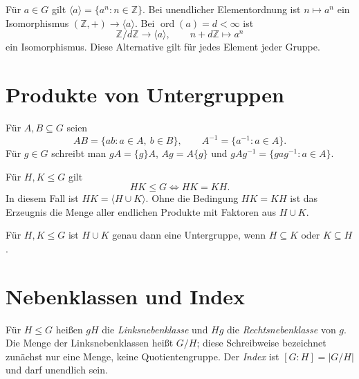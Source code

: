 \begin{theorem}
Für \(a\in G\) gilt \(\langle a\rangle=\{a^n:n\in\mathbb Z\}\).
Bei unendlicher Elementordnung ist \(n\mapsto a^n\) ein Isomorphismus
\((\mathbb Z,+)\to\langle a\rangle\).
Bei \(\operatorname{ord}(a)=d<\infty\) ist
\[
 \mathbb Z/d\mathbb Z\longrightarrow\langle a\rangle,\qquad
 n+d\mathbb Z\longmapsto a^n
\]
ein Isomorphismus. Diese Alternative gilt für jedes Element jeder Gruppe.
\cite{milne}
\end{theorem}

\section{Produkte von Untergruppen}

\begin{definition}
Für \(A,B\subseteq G\) seien
\[
 AB=\{ab:a\in A,\ b\in B\},\qquad A^{-1}=\{a^{-1}:a\in A\}.
\]
Für \(g\in G\) schreibt man \(gA=\{g\}A\), \(Ag=A\{g\}\)
und \(gAg^{-1}=\{gag^{-1}:a\in A\}\).
\end{definition}

\begin{theorem}
Für \(H,K\leq G\) gilt
\[
 HK\leq G\iff HK=KH.
\]
In diesem Fall ist \(HK=\langle H\cup K\rangle\).
Ohne die Bedingung \(HK=KH\) ist das Erzeugnis die Menge aller
endlichen Produkte mit Faktoren aus \(H\cup K\). \cite{milne}
\end{theorem}

\begin{theorem}
Für \(H,K\leq G\) ist \(H\cup K\) genau dann eine Untergruppe, wenn
\(H\subseteq K\) oder \(K\subseteq H\). \cite{milne}
\end{theorem}

\section{Nebenklassen und Index}

\begin{definition}
Für \(H\leq G\) heißen \(gH\) die \emph{Linksnebenklasse} und
\(Hg\) die \emph{Rechtsnebenklasse} von \(g\).
Die Menge der Linksnebenklassen heißt \(G/H\); diese Schreibweise
bezeichnet zunächst nur eine Menge, keine Quotientengruppe.
Der \emph{Index} ist \([G:H]=|G/H|\) und darf unendlich sein.
\end{definition}

